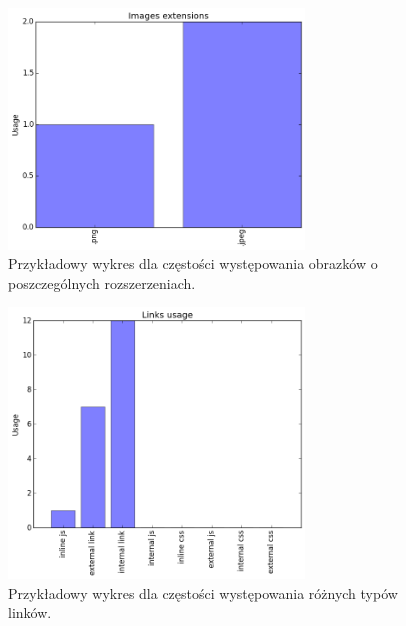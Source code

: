 \documentclass[12pt]{article}
\begin{document}
\begin{figure}[h]
\centering
\caption{Przykładowy wykres dla częstości występowania obrazków o poszczególnych rozszerzeniach.}
\label{img:wykresObrazki}
\includegraphics[width=0.7\textwidth]{WykresObrazki.png}
\end{figure}

\begin{figure}[h]
\centering
\caption{Przykładowy wykres dla częstości występowania różnych typów linków.}
\label{img:wykresLinków}
\includegraphics[width=0.7\textwidth]{WykresLinki.png}
\end{figure}
\end{document}
